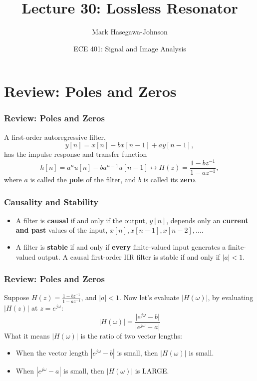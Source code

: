 \documentclass{beamer}
\title{Lecture 30: Lossless Resonator}
\author{Mark Hasegawa-Johnson}
\date{ECE 401: Signal and Image Analysis}
\begin{document}
\begin{frame}
  \maketitle
\end{frame}

\begin{frame}
  \tableofcontents
\end{frame}

\section[Review]{Review: Poles and Zeros}
\setcounter{subsection}{1}

\begin{frame}
  \frametitle{Review: Poles and Zeros}
  A first-order autoregressive filter,
  \[
  y[n] = x[n]-bx[n-1]+ay[n-1],
  \]
  has the impulse response and transfer function
  \[
  h[n]=a^n u[n]-ba^{n-1}u[n-1] \leftrightarrow H(z)  = \frac{1-bz^{-1}}{1-az^{-1}},
  \]
  where $a$ is called the {\bf pole} of the filter, and $b$ is called
  its {\bf zero}.
\end{frame}

\begin{frame}
  \frametitle{Causality and Stability}
  \begin{itemize}
  \item A filter is {\bf causal} if and only if the output, $y[n]$,
    depends only an {\bf current and past} values of the input, $x[n],
    x[n-1],x[n-2],\ldots$.
  \item A filter is {\bf stable} if and only if {\bf every}
    finite-valued input generates a finite-valued output.  A causal
    first-order IIR filter is stable if and only if $|a|<1$.
  \end{itemize}
\end{frame}

\begin{frame}
  \frametitle{Review: Poles and Zeros}

  Suppose $H(z)=\frac{1-bz^{-1}}{1-az^{-1}}$, and $|a|<1$.  Now let's
  evaluate $|H(\omega)|$, by evaluating $|H(z)|$ at $z=e^{j\omega}$:
  \[
  \vert H(\omega)\vert = 
  \frac{\vert e^{j\omega}-b\vert}{\vert e^{j\omega}-a\vert}
  \]
  What it means $|H(\omega)|$ is the ratio of two vector lengths:
  \begin{itemize}
  \item When the vector length $|e^{j\omega}-b|$ is small, then
    $|H(\omega)|$ is small.
  \item When $|e^{j\omega}-a|$ is small, then $|H(\omega)|$ is LARGE.
  \end{itemize}
\end{frame}
\end{document}
